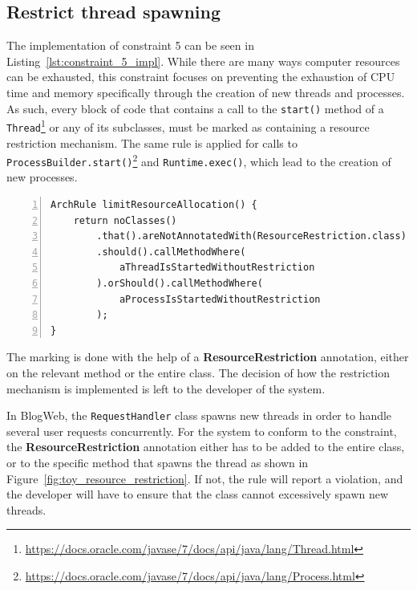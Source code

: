\subsection{Restrict thread spawning}
The implementation of constraint 5 can be seen in Listing~\ref{lst:constraint_5_impl}.
While there are many ways computer resources can be exhausted, this constraint focuses on preventing the exhaustion of CPU time and memory specifically through the creation of new threads and processes. As such, every block of code that contains a call to the \texttt{start()} method of a \texttt{Thread}\footnote{\url{https://docs.oracle.com/javase/7/docs/api/java/lang/Thread.html}} or any of its subclasses, must be marked as containing a resource restriction mechanism. The same rule is applied for calls to \texttt{ProcessBuilder.start()}\footnote{\url{https://docs.oracle.com/javase/7/docs/api/java/lang/Process.html}\label{fnt:java_process}} and \texttt{Runtime.exec()}, which lead to the creation of new processes.

\begin{minipage}{\linewidth}
\begin{lstlisting}[caption={Rule definition for constraint 5.}, captionpos=b, label=lst:constraint_5_impl, numbers=left]
ArchRule limitResourceAllocation() {
    return noClasses()
        .that().areNotAnnotatedWith(ResourceRestriction.class)
        .should().callMethodWhere(
            aThreadIsStartedWithoutRestriction
        ).orShould().callMethodWhere(
            aProcessIsStartedWithoutRestriction
        );
}
\end{lstlisting}
\end{minipage}

The marking is done with the help of a \textbf{ResourceRestriction} annotation, either on the relevant method or the entire class. The decision of how the restriction mechanism is implemented is left to the developer of the system.

In BlogWeb, the \texttt{RequestHandler} class spawns new threads in order to handle several user requests concurrently. For the system to conform to the constraint, the \textbf{ResourceRestriction} annotation either has to be added to the entire class, or to the specific method that spawns the thread as shown in Figure~\ref{fig:toy_resource_restriction}. If not, the rule will report a violation, and the developer will have to ensure that the class cannot excessively spawn new threads.

